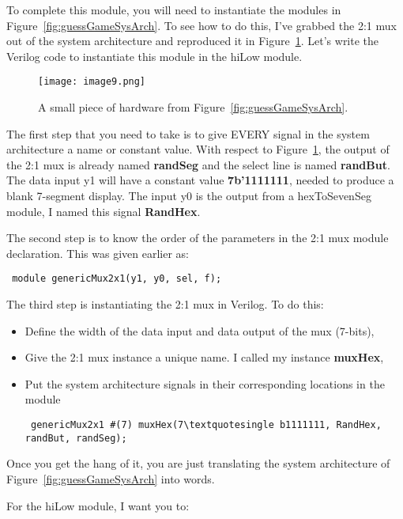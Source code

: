 To complete this module, you will need to instantiate the modules in
Figure~\ref{fig:guessGameSysArch}. To see how to do this, I've grabbed the 2:1 mux out of the
system architecture and reproduced it in Figure~\ref{fig:snippetFromSysArch}. 
Let's write the
Verilog code to instantiate this module in the hiLow module.

\begin{figure}[ht]
\texttt{[image: image9.png]}
\caption{A small piece of hardware from Figure~\ref{fig:guessGameSysArch}.}
\label{fig:snippetFromSysArch}
\end{figure}

The first step that you need to take is to give EVERY signal in the
system architecture a name or constant value. With respect to Figure~\ref{fig:snippetFromSysArch},
the output of the 2:1 mux is already named \textbf{randSeg} and the
select line is named \textbf{randBut}. The data input y1 will have a
constant value \textbf{7b'1111111}, needed to produce a blank 7-segment
display. The input y0 is the output from a hexToSevenSeg module, I named
this signal \textbf{RandHex}.

The second step is to know the order of the parameters in the 2:1 mux
module declaration. This was given earlier as:

\verb+ module genericMux2x1(y1, y0, sel, f); +


The third step is instantiating the 2:1 mux in Verilog. To do this:

\begin{itemize}
\item
  Define the width of the data input and data output of the mux
  (7-bits),
\item
  Give the 2:1 mux instance a unique name. I called my instance
  \textbf{muxHex},
\item
  Put the system architecture signals in their corresponding locations
  in the module

\verb+ genericMux2x1 #(7) muxHex(7\textquotesingle b1111111, RandHex, randBut, randSeg); +
\end{itemize}

Once you get the hang of it, you are just translating the system
architecture of Figure~\ref{fig:guessGameSysArch} into words.

For the hiLow module, I want you to:


